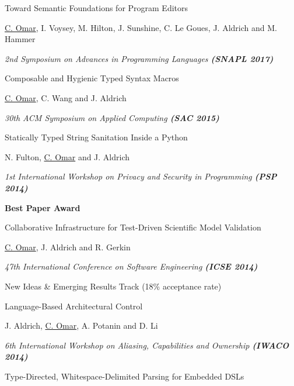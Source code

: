 \documentclass[10pt,letterpaper]{article}
\renewenvironment{itemize}{
  \begin{list}{}{
    \setlength{\leftmargin}{1.5em}
    \setlength{\itemsep}{0.25em}
    \setlength{\parskip}{0pt}
    \setlength{\parsep}{0.25em}
  }
}{
  \end{list}
}
\begin{document}
\begin{enumerate}[resume]
\item Toward Semantic Foundations for Program Editors
  \begin{itemize}
    \item \underline{C. Omar}, I. Voysey, M. Hilton, J. Sunshine, C. Le Goues, J. Aldrich and M. Hammer
    \item \textit{2nd Symposium on Advances in Programming Languages \textbf{(SNAPL 2017)}}
  \end{itemize}
\item Composable and Hygienic Typed Syntax Macros
  \begin{itemize}
    \item \underline{C. Omar}, C. Wang and J. Aldrich
    \item \textit{30th ACM Symposium on Applied Computing \textbf{(SAC 2015)}}
  \end{itemize}
\item Statically Typed String Sanitation Inside a Python
  \begin{itemize}
    \item N. Fulton, \underline{C. Omar} and J. Aldrich
    \item \textit{1st International Workshop on Privacy and Security in Programming \textbf{(PSP 2014)}}
    \item \textbf{Best Paper Award}
  \end{itemize}
\item Collaborative Infrastructure for Test-Driven Scientific Model Validation
  \begin{itemize}
    \item \underline{C. Omar}, J. Aldrich and R. Gerkin
    \item \textit{47th International Conference on Software Engineering \textbf{(ICSE 2014)}}
    \item New Ideas \& Emerging Results Track (18\% acceptance rate)
  \end{itemize}
\item Language-Based Architectural Control
  \begin{itemize}
    \item J. Aldrich, \underline{C. Omar}, A. Potanin and D. Li
    \item \textit{6th International Workshop on Aliasing, Capabilities and Ownership \textbf{(IWACO 2014)}}
  \end{itemize}
\item Type-Directed, Whitespace-Delimited Parsing for Embedded DSLs

\end{enumerate}
\end{document}
